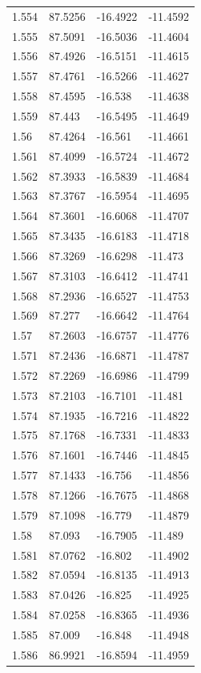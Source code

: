 \begin{tabular}{llll}
1.554 & 87.5256 & -16.4922 & -11.4592 \\
1.555 & 87.5091 & -16.5036 & -11.4604 \\
1.556 & 87.4926 & -16.5151 & -11.4615 \\
1.557 & 87.4761 & -16.5266 & -11.4627 \\
1.558 & 87.4595 & -16.538 & -11.4638 \\
1.559 & 87.443 & -16.5495 & -11.4649 \\
1.56 & 87.4264 & -16.561 & -11.4661 \\
1.561 & 87.4099 & -16.5724 & -11.4672 \\
1.562 & 87.3933 & -16.5839 & -11.4684 \\
1.563 & 87.3767 & -16.5954 & -11.4695 \\
1.564 & 87.3601 & -16.6068 & -11.4707 \\
1.565 & 87.3435 & -16.6183 & -11.4718 \\
1.566 & 87.3269 & -16.6298 & -11.473 \\
1.567 & 87.3103 & -16.6412 & -11.4741 \\
1.568 & 87.2936 & -16.6527 & -11.4753 \\
1.569 & 87.277 & -16.6642 & -11.4764 \\
1.57 & 87.2603 & -16.6757 & -11.4776 \\
1.571 & 87.2436 & -16.6871 & -11.4787 \\
1.572 & 87.2269 & -16.6986 & -11.4799 \\
1.573 & 87.2103 & -16.7101 & -11.481 \\
1.574 & 87.1935 & -16.7216 & -11.4822 \\
1.575 & 87.1768 & -16.7331 & -11.4833 \\
1.576 & 87.1601 & -16.7446 & -11.4845 \\
1.577 & 87.1433 & -16.756 & -11.4856 \\
1.578 & 87.1266 & -16.7675 & -11.4868 \\
1.579 & 87.1098 & -16.779 & -11.4879 \\
1.58 & 87.093 & -16.7905 & -11.489 \\
1.581 & 87.0762 & -16.802 & -11.4902 \\
1.582 & 87.0594 & -16.8135 & -11.4913 \\
1.583 & 87.0426 & -16.825 & -11.4925 \\
1.584 & 87.0258 & -16.8365 & -11.4936 \\
1.585 & 87.009 & -16.848 & -11.4948 \\
1.586 & 86.9921 & -16.8594 & -11.4959 \\

\end{tabular}
